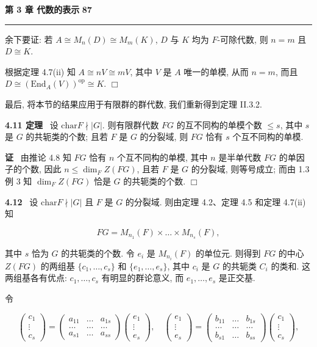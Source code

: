 \documentclass[11pt,a4paper]{article}
\begin{document}
\newpage
\noindent \textbf{第 3 章 \quad 代数的表示} \hfill \textbf{87}
\vspace{0.5em} \hrule \vspace{1.5em}

余下要证: 若 $A \cong M_n(D) \cong M_m(K)$, $D$ 与 $K$ 均为 $F$-可除代数, 则 $n = m$ 且 $D \cong K$.

根据定理 4.7(ii) 知 $A \cong nV \cong mV$, 其中 $V$ 是 $A$ 唯一的单模, 从而 $n = m$, 而且 $D \cong (\mathrm{End}_A(V))^{\mathrm{op}} \cong K$. \hfill $\Box$
\vspace{1em}

最后, 将本节的结果应用于有限群的群代数, 我们重新得到定理 II.3.2.

\textbf{4.11 定理} \ 设 $\mathrm{char}F \nmid |G|$. 则有限群代数 $FG$ 的互不同构的单模个数 $\leq s$, 其中 $s$ 是 $G$ 的共轭类的个数; 且若 $F$ 是 $G$ 的分裂域, 则 $FG$ 恰有 $s$ 个互不同构的单模.

\textbf{证} \ 由推论 4.8 知 $FG$ 恰有 $n$ 个互不同构的单模, 其中 $n$ 是半单代数 $FG$ 的单因子的个数, 因此 $n \leq \dim_F Z(FG)$, 且若 $F$ 是 $G$ 的分裂域, 则等号成立; 而由 1.3 例 3 知 $\dim_F Z(FG)$ 恰是 $G$ 的共轭类的个数. \hfill $\Box$
\vspace{0.5em}

\textbf{4.12} \ 设 $\mathrm{char}F \nmid |G|$ 且 $F$ 是 $G$ 的分裂域. 则由定理 4.2、定理 4.5 和定理 4.7(ii) 知

$$
FG = M_{n_1}(F) \times \dots \times M_{n_s}(F),
$$

其中 $s$ 恰为 $G$ 的共轭类的个数. 令 $e_i$ 是 $M_{n_i}(F)$ 的单位元. 则得到 $FG$ 的中心 $Z(FG)$ 的两组基 $\{c_1, \dots, c_s\}$ 和 $\{e_1, \dots, e_s\}$, 其中 $c_i$ 是 $G$ 的共轭类 $C_i$ 的类和. 这两组基各有优点: $c_1, \dots, c_s$ 有明显的群论意义, 而 $e_1, \dots, e_s$ 是正交基.

令

$$
\begin{pmatrix} c_1 \\ \vdots \\ c_s \end{pmatrix}
= \begin{pmatrix}
a_{11} & \dots & a_{1s} \\
\dots & \dots & \dots \\
a_{s1} & \dots & a_{ss}
\end{pmatrix}
\begin{pmatrix} e_1 \\ \vdots \\ e_s \end{pmatrix}, \quad
\begin{pmatrix} e_1 \\ \vdots \\ e_s \end{pmatrix}
= \begin{pmatrix}
b_{11} & \dots & b_{1s} \\
\dots & \dots & \dots \\
b_{s1} & \dots & b_{ss}
\end{pmatrix}
\begin{pmatrix} c_1 \\ \vdots \\ c_s \end{pmatrix},
$$
\end{document}

